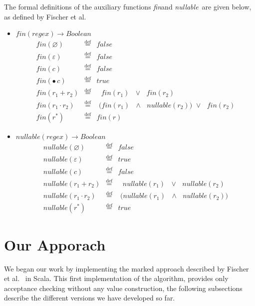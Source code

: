 \documentclass[12pt]{article}
\newcommand{\Marked}[1]{\bullet\,#1}
\newcommand{\fin}{\textit{fin}}
\newcommand{\nullable}{\textit{nullable}}
\begin{document}
The formal definitions of the auxiliary functions \fin and \nullable\ are given below, as defined by Fischer et al.~\cite{Fischer2010}
\begin{itemize}
\item $fin(regex) \rightarrow Boolean $
  \[
\begin{array}{rcl}
  fin(\varnothing)              & \stackrel{\text{def}}{=} & false \\
  fin(\varepsilon)              & \stackrel{\text{def}}{=} & false \\
  fin(c)              & \stackrel{\text{def}}{=} & false \\
  fin(\Marked{c})      & \stackrel{\text{def}}{=} & true \\
  fin(r_1 + r_2)      & \stackrel{\text{def}}{=} & \text{ $fin(r_1)$ $\lor$ $fin(r_2)$}\\ 
  fin(r_1 \cdot r_2)  & \stackrel{\text{def}}{=} & \text{ ($fin(r_1)$ $\land$ $\nullable(r_2)$) $\lor$ $fin(r_2)$}\\
  fin(r^*)            & \stackrel{\text{def}}{=} & fin(r)  
\end{array}
\]

\item $\nullable(regex) \rightarrow Boolean $
  \[
\begin{array}{rcl}
  \nullable(\varnothing)         & \stackrel{\text{def}}{=} & false \\
  \nullable(\varepsilon)              & \stackrel{\text{def}}{=} & true \\
  \nullable(c)              & \stackrel{\text{def}}{=} & false \\
  \nullable(r_1 + r_2)      & \stackrel{\text{def}}{=} & \text{ $nullable(r_1)$ $\lor$ $nullable(r_2)$}\\ 
  \nullable(r_1 \cdot r_2)      & \stackrel{\text{def}}{=} & \text{ ($nullable(r_1)$ $\land$ $nullable(r_2)$)}\\
  \nullable(r^*)      & \stackrel{\text{def}}{=} & true 
\end{array}
\]

\end{itemize}

\section{Our Apporach}

We began our work by implementing the marked approach described by Fischer et al.~\cite{Fischer2010} in Scala. 
This first implementation of the algorithm, provides only acceptance checking without any value construction, 
the following subsections describe the different versions we have developed so far.
\end{document}
